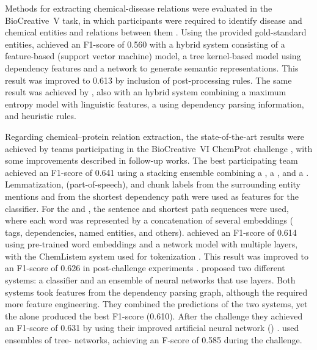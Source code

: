 Methods for extracting chemical-disease relations were evaluated in the BioCreative~V  task, in which participants were required to identify disease and chemical entities and relations between them \parencite{wei2016a}.
Using the provided gold-standard entities, \textcite{zhou2016a} achieved an F1-score of 0.560 with a hybrid system consisting of a feature-based  (support vector machine) model, a tree kernel-based model using dependency features and a  network to generate semantic representations.
This result was improved to 0.613 by inclusion of post-processing rules.
The same result was achieved by \textcite{gu2017a}, also with an hybrid system combining a maximum entropy model with linguistic features, a  using dependency parsing information, and heuristic rules.

Regarding chemical--protein relation extraction, the state-of-the-art results were achieved by teams participating in the BioCreative~VI ChemProt challenge \parencite{krallinger2017a}, with some improvements described in follow-up works.
The best participating team achieved an F1-score of 0.641 using a stacking ensemble combining a , a , and a  \parencite{peng2017b,peng2018a}.
Lemmatization,  (part-of-speech), and chunk labels from the surrounding entity mentions and from the shortest dependency path were used as features for the  classifier.
For the  and , the sentence and shortest path sequences were used, where each word was represented by a concatenation of several embeddings ( tags, dependencies, named entities, and others).
\textcite{corbett2017a} achieved an F1-score of 0.614 using pre-trained word embeddings and a network model with multiple  layers, with the ChemListem  system used for tokenization \parencite{corbett2017b}.
This result was improved to an F1-score of 0.626 in post-challenge experiments \parencite{corbett2018a}.
\textcite{mehryary2017a} proposed two different systems: a  classifier and an ensemble of neural networks that use  layers.
Both systems took features from the dependency parsing graph, although the  required more feature engineering.
They combined the predictions of the two systems, yet the  alone produced the best F1-score (0.610).
After the challenge they achieved an F1-score of 0.631 by using their improved artificial neural network () \parencite{mehryary2018a}.
\textcite{lim2017a} used ensembles of tree- networks, achieving an F-score of 0.585 during the challenge.
